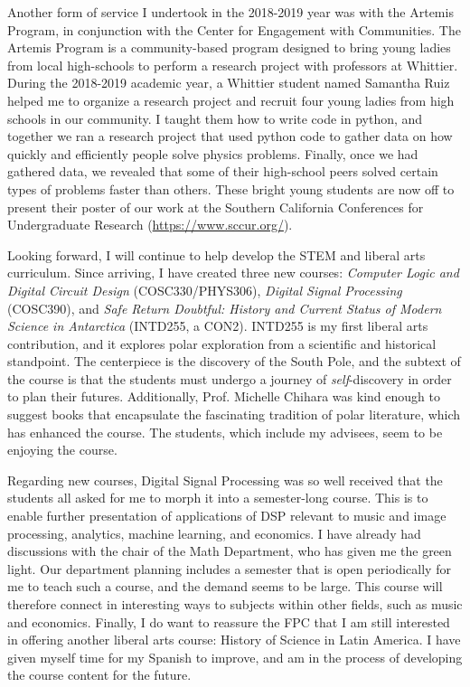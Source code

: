 \documentclass[../../main.tex]{subfiles}
\begin{document}
Another form of service I undertook in the 2018-2019 year was with the Artemis Program, in conjunction with the Center for Engagement with Communities.  The Artemis Program is a community-based program designed to bring young ladies from local high-schools to perform a research project with professors at Whittier.  During the 2018-2019 academic year, a Whittier student named Samantha Ruiz helped me to organize a research project and recruit four young ladies from high schools in our community.  I taught them how to write code in python, and together we ran a research project that used python code to gather data on how quickly and efficiently people solve physics problems.  Finally, once we had gathered data, we revealed that some of their high-school peers solved certain types of problems faster than others.  These bright young students are now off to present their poster of our work at the Southern California Conferences for Undergraduate Research (\url{https://www.sccur.org/}). \\ \hspace{0.1cm}

Looking forward, I will continue to help develop the STEM and liberal arts curriculum.  Since arriving, I have created three new courses: \textit{Computer Logic and Digital Circuit Design} (COSC330/PHYS306), \textit{Digital Signal Processing} (COSC390), and \textit{Safe Return Doubtful: History and Current Status of Modern Science in Antarctica} (INTD255, a CON2).  INTD255 is my first liberal arts contribution, and it explores polar exploration from a scientific and historical standpoint.  The centerpiece is the discovery of the South Pole, and the subtext of the course is that the students must undergo a journey of \textit{self}-discovery in order to plan their futures.  Additionally, Prof. Michelle Chihara was kind enough to suggest books that encapsulate the fascinating tradition of polar literature, which has enhanced the course.  The students, which include my advisees, seem to be enjoying the course.  \\ \hspace{0.1cm}

Regarding new courses, Digital Signal Processing was so well received that the students all asked for me to morph it into a semester-long course.  This is to enable further presentation of applications of DSP relevant to music and image processing, analytics, machine learning, and economics.  I have already had discussions with the chair of the Math Department, who has given me the green light.  Our department planning includes a semester that is open periodically for me to teach such a course, and the demand seems to be large.  This course will therefore connect in interesting ways to subjects within other fields, such as music and economics.  Finally, I do want to reassure the FPC that I am still interested in offering another liberal arts course: History of Science in Latin America.  I have given myself time for my Spanish to improve, and am in the process of developing the course content for the future. \\ \hspace{0.1cm}
\end{document}
